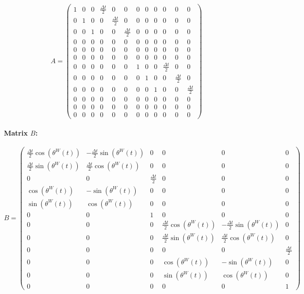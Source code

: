 \documentclass{article}
\begin{document}
\[
A = \begin{pmatrix}
1 & 0 & 0 & \frac{\Delta t}{2} & 0 & 0 & 0 & 0 & 0 & 0 & 0 & 0 \\
0 & 1 & 0 & 0 & \frac{\Delta t}{2} & 0 & 0 & 0 & 0 & 0 & 0 & 0 \\
0 & 0 & 1 & 0 & 0 & \frac{\Delta t}{2} & 0 & 0 & 0 & 0 & 0 & 0 \\
0 & 0 & 0 & 0 & 0 & 0 & 0 & 0 & 0 & 0 & 0 & 0 \\
0 & 0 & 0 & 0 & 0 & 0 & 0 & 0 & 0 & 0 & 0 & 0 \\
0 & 0 & 0 & 0 & 0 & 0 & 0 & 0 & 0 & 0 & 0 & 0 \\
0 & 0 & 0 & 0 & 0 & 0 & 1 & 0 & 0 & \frac{\Delta t}{2} & 0 & 0 \\
0 & 0 & 0 & 0 & 0 & 0 & 0 & 1 & 0 & 0 & \frac{\Delta t}{2} & 0 \\
0 & 0 & 0 & 0 & 0 & 0 & 0 & 0 & 1 & 0 & 0 & \frac{\Delta t}{2} \\
0 & 0 & 0 & 0 & 0 & 0 & 0 & 0 & 0 & 0 & 0 & 0 \\
0 & 0 & 0 & 0 & 0 & 0 & 0 & 0 & 0 & 0 & 0 & 0 \\
0 & 0 & 0 & 0 & 0 & 0 & 0 & 0 & 0 & 0 & 0 & 0
\end{pmatrix}
\]

\paragraph{Matrix \(B\):}

\[
B = \begin{pmatrix}
\frac{\Delta t}{2} \cos(\theta^W(t)) & -\frac{\Delta t}{2} \sin(\theta^W(t)) & 0 & 0 & 0 & 0 \\
\frac{\Delta t}{2} \sin(\theta^W(t)) & \frac{\Delta t}{2} \cos(\theta^W(t)) & 0 & 0 & 0 & 0 \\
0 & 0 & \frac{\Delta t}{2} & 0 & 0 & 0 \\
\cos(\theta^W(t)) & -\sin(\theta^W(t)) & 0 & 0 & 0 & 0 \\
\sin(\theta^W(t)) & \cos(\theta^W(t)) & 0 & 0 & 0 & 0 \\
0 & 0 & 1 & 0 & 0 & 0 \\
0 & 0 & 0 & \frac{\Delta t}{2} \cos(\theta^W(t))& -\frac{\Delta t}{2} \sin(\theta^W(t)) & 0 \\
0 & 0 & 0 & \frac{\Delta t}{2} \sin(\theta^W(t)) & \frac{\Delta t}{2} \cos(\theta^W(t)) & 0 \\
0 & 0 & 0 & 0 & 0 & \frac{\Delta t}{2} \\
0 & 0 & 0 & \cos(\theta^W(t)) & -\sin(\theta^W(t)) & 0 \\
0 & 0 & 0 & \sin(\theta^W(t)) & \cos(\theta^W(t)) & 0 \\
0 & 0 & 0 & 0 & 0 & 1
\end{pmatrix}
\]
\end{document}
